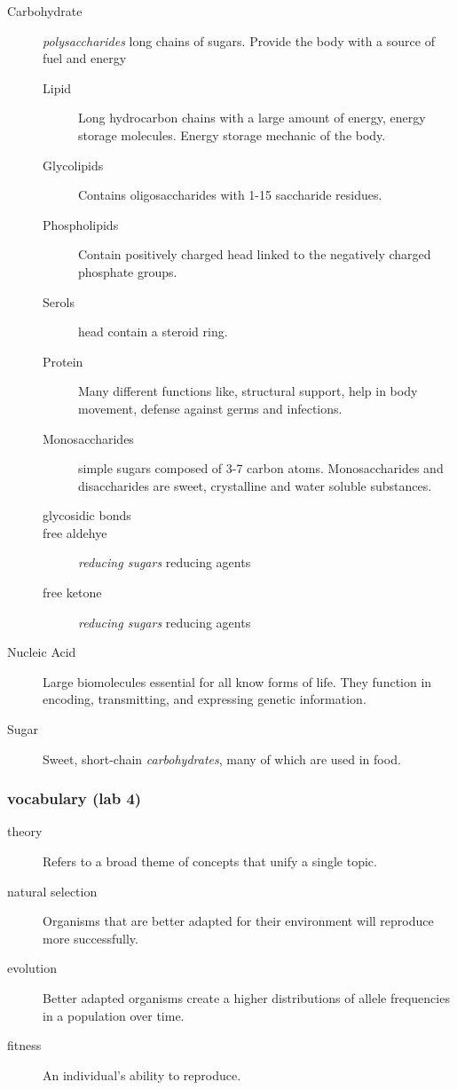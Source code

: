 \documentclass[11pt]{article}
\begin{document}
\begin{description}
\item[{Carbohydrate}] \emph{polysaccharides} long chains of sugars. Provide the body
with a source of fuel and energy
\begin{description}
\item[{Lipid}] Long hydrocarbon chains with a large amount of energy, energy
storage molecules. Energy storage mechanic of the body.
\item[{Glycolipids}] Contains oligosaccharides with 1-15 saccharide residues.
\item[{Phospholipids}] Contain positively charged head linked to the
negatively charged phosphate groups.
\item[{Serols}] head contain a steroid ring.
\item[{Protein}] Many different functions like, structural support, help in
body movement, defense against germs and infections.
\item[{Monosaccharides}] simple sugars composed of 3-7 carbon atoms.
Monosaccharides and disaccharides are sweet, crystalline and water
soluble substances.
\item[{glycosidic bonds}] 

\item[{free aldehye}] \emph{reducing sugars} reducing agents
\item[{free ketone}] \emph{reducing sugars} reducing agents
\end{description}
\item[{Nucleic Acid}] Large biomolecules essential for all know forms of life.
They function in encoding, transmitting, and expressing genetic
information.
\item[{Sugar}] Sweet, short-chain \emph{carbohydrates}, many of which are used in
food.
\end{description}
\subsubsection{vocabulary (lab 4)}
\label{sec:orgd88857e}

\begin{description}
\item[{theory}] Refers to a broad theme of concepts that unify a single topic.

\item[{natural selection}] Organisms that are better adapted for their
environment will reproduce more successfully.

\item[{evolution}] Better adapted organisms create a higher distributions of
allele frequencies in a population over time.

\item[{fitness}] An individual's ability to reproduce.
\end{description}
\end{document}
